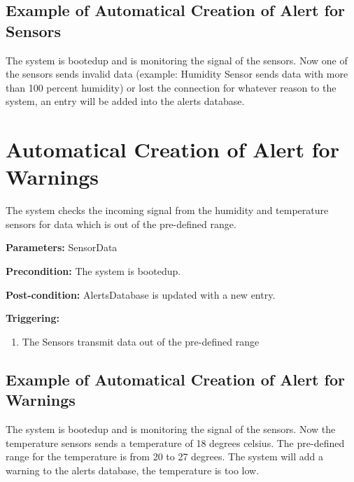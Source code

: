 \subsection{Example of Automatical Creation of Alert for Sensors}
The system is bootedup and is monitoring the signal of the sensors.
Now one of the sensors sends invalid data (example: Humidity Sensor sends data
with more than 100 percent humidity) or lost the connection for whatever reason
to the system, an entry will be added into the alerts database.




\section{Automatical Creation of Alert for Warnings}
\label{operation:AddAlertForWarnigns}
The system checks the incoming signal from the humidity and temperature sensors
for data which is out of the pre-defined range.

\begin{description}

\item \textbf{Parameters:} SensorData
\item \textbf{Precondition:} The system is bootedup.
\item \textbf{Post-condition:} AlertsDatabase is updated with a new entry.

\item \textbf{Triggering:}
\begin{enumerate}
\item The Sensors transmit data out of the pre-defined range
\end{enumerate}
\end{description}

\subsection{Example of Automatical Creation of Alert for Warnings}
The system is bootedup and is monitoring the signal of the sensors.
Now the temperature sensors sends a temperature of 18 degrees celsius. The
pre-defined range for the temperature is from 20 to 27 degrees. The system will
add a warning to the alerts database, the temperature is too low.

